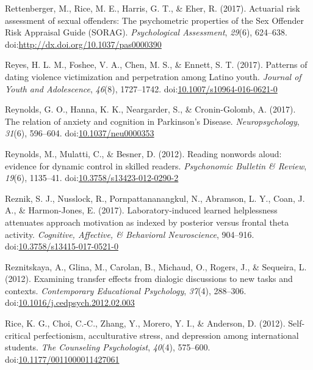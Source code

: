 \documentclass[english,man]{apa6}
\begin{document}
\hypertarget{ref-Rettenberger2017}{}
Rettenberger, M., Rice, M. E., Harris, G. T., \& Eher, R. (2017).
Actuarial risk assessment of sexual offenders: The psychometric
properties of the Sex Offender Risk Appraisal Guide (SORAG).
\emph{Psychological Assessment}, \emph{29}(6), 624--638.
doi:\href{https://doi.org/http://dx.doi.org/10.1037/pas0000390}{http://dx.doi.org/10.1037/pas0000390}

\hypertarget{ref-Reyes2017}{}
Reyes, H. L. M., Foshee, V. A., Chen, M. S., \& Ennett, S. T. (2017).
Patterns of dating violence victimization and perpetration among Latino
youth. \emph{Journal of Youth and Adolescence}, \emph{46}(8),
1727--1742.
doi:\href{https://doi.org/10.1007/s10964-016-0621-0}{10.1007/s10964-016-0621-0}

\hypertarget{ref-Reynolds2017}{}
Reynolds, G. O., Hanna, K. K., Neargarder, S., \& Cronin-Golomb, A.
(2017). The relation of anxiety and cognition in Parkinson's Disease.
\emph{Neuropsychology}, \emph{31}(6), 596--604.
doi:\href{https://doi.org/10.1037/neu0000353}{10.1037/neu0000353}

\hypertarget{ref-Reynolds2012}{}
Reynolds, M., Mulatti, C., \& Besner, D. (2012). Reading nonwords aloud:
evidence for dynamic control in skilled readers. \emph{Psychonomic
Bulletin \& Review}, \emph{19}(6), 1135--41.
doi:\href{https://doi.org/10.3758/s13423-012-0290-2}{10.3758/s13423-012-0290-2}

\hypertarget{ref-Reznik2017}{}
Reznik, S. J., Nusslock, R., Pornpattananangkul, N., Abramson, L. Y.,
Coan, J. A., \& Harmon-Jones, E. (2017). Laboratory-induced learned
helplessness attenuates approach motivation as indexed by posterior
versus frontal theta activity. \emph{Cognitive, Affective, \& Behavioral
Neuroscience}, 904--916.
doi:\href{https://doi.org/10.3758/s13415-017-0521-0}{10.3758/s13415-017-0521-0}

\hypertarget{ref-Reznitskaya2012}{}
Reznitskaya, A., Glina, M., Carolan, B., Michaud, O., Rogers, J., \&
Sequeira, L. (2012). Examining transfer effects from dialogic
discussions to new tasks and contexts. \emph{Contemporary Educational
Psychology}, \emph{37}(4), 288--306.
doi:\href{https://doi.org/10.1016/j.cedpsych.2012.02.003}{10.1016/j.cedpsych.2012.02.003}

\hypertarget{ref-Rice2012}{}
Rice, K. G., Choi, C.-C., Zhang, Y., Morero, Y. I., \& Anderson, D.
(2012). Self-critical perfectionism, acculturative stress, and
depression among international students. \emph{The Counseling
Psychologist}, \emph{40}(4), 575--600.
doi:\href{https://doi.org/10.1177/0011000011427061}{10.1177/0011000011427061}
\end{document}
